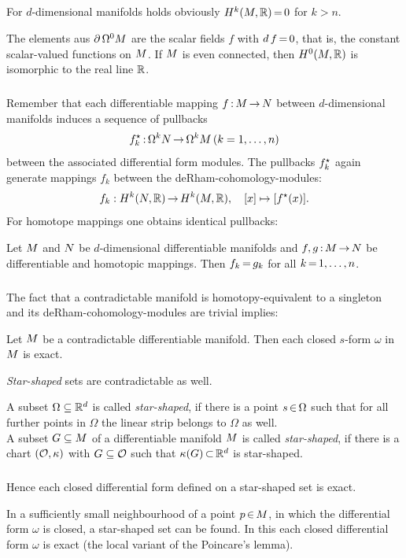 \documentclass[11pt,twoside]{article}
\begin{document}
\subparagraph{}
For $d$-dimensional manifolds holds
obviously $H^k({M},{\mathbb{R}}) {\,=\,} 0$ for $k > n$.

The elements aus $\partial \, \Omega^0 {M}$ are the scalar fields $f$ with
$d \, f {\,=\,} 0$,
that is,
the constant scalar-valued functions on ${M}$.
If ${M}$ is even connected,
then $H^0({M},{\mathbb{R}})$ is isomorphic to the real line ${\mathbb{R}}$.

\subparagraph{}
Remember that each differentiable mapping $f {\,:\,} {M} {\,\to\,} {N}$
between $d$-dimensional manifolds induces a sequence of pullbacks
\[
f^\star_k {\,:\,} \Omega^k {N} {\,\to\,} \Omega^k {M} \, (k=1,\ldots,n)
\]
between the associated differential form modules.
The pullbacks $f^\star_k$ again generate mappings $f_k$
between the deRham-cohomology-modules:
\[
f_k: H^k({N},{\mathbb{R}}) {\,\to\,} H^k({M},{\mathbb{R}}), \quad [x] \mapsto [f^\star(x)].
\]
For homotope mappings one obtains identical pullbacks:

\begin{theorem}
Let ${M}$ and ${N}$ be $d$-dimensional differentiable manifolds
and $f,g {\,:\,} {M} {\,\to\,} {N}$ be differentiable and homotopic mappings.
Then $f_k {\,=\,} g_k$ for all $k {\,=\,} 1,\ldots,n$.
\end{theorem}

\subparagraph{}
The fact that a contradictable manifold
is homotopy-equivalent to a singleton and its
deRham-cohomology-modules are trivial implies:

\begin{theorem}
Let ${M}$ be a contradictable differentiable manifold.
Then each closed $s$-form $\omega$ in ${M}$ is exact.
\end{theorem}

\textit{Star-shaped} sets are contradictable as well.

\begin{definition}
A subset $\Omega \subseteq {\mathbb{R}}^d$ is called \textit{star-shaped},
if there is a point $s {\,\in\,} \Omega$
such that
for all further points in $\Omega$ the linear strip
belongs to $\Omega$ as well.\\
A subset $G \subseteq {M}$
of a differentiable manifold ${M}$ is called \textit{star-shaped},
if there is a chart $(\mathcal{O},\kappa)$ with $G \subseteq \mathcal{O}$
such that
$\kappa(G) {\,\subset\,} {\mathbb{R}}^d$ is star-shaped.
\end{definition}

\subparagraph{}
Hence each closed differential form defined on a star-shaped set is exact.

\begin{example}
In a sufficiently small neighbourhood of a point $p {\,\in\,} {M}$,
in which the differential form $\omega$ is closed,
a star-shaped set can be found.
In this each closed differential form $\omega$ is exact
(the local variant of the Poincare's lemma).
\end{example}
\end{document}
